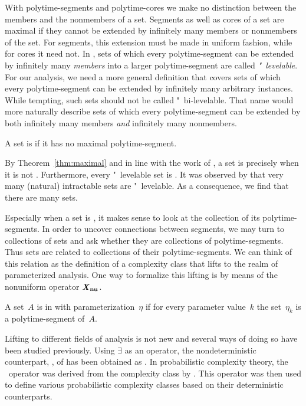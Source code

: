 With polytime-segments and polytime-cores we make no distinction between the members and the nonmembers of a set.
Segments as well as cores of a set are maximal if they cannot be extended by infinitely many members or nonmembers of the set.
For segments, this extension must be made in uniform fashion, while for cores it need not.
In \parencite{orponen1985polynomial,orponen1986optimal}, sets of which every polytime-segment can be extended by infinitely many \emph{members} into a larger polytime-segment are called \emph{"~levelable}.
For our analysis, we need a more general definition that covers sets of which every polytime-segment can be extended by infinitely many arbitrary instances.
While tempting, such sets should not be called "~bi-levelable.
That name would more naturally describe sets of which every polytime-segment can be extended by both infinitely many members \emph{and} infinitely many nonmembers.
\begin{definition}
  A set is  if it has no maximal polytime-segment.
\end{definition}
By Theorem~\ref{thm:maximal} and in line with the work of \textcite{orponen1985polynomial}, a set is  precisely when it is not .
Furthermore, every "~levelable set is .
It was observed by \textcite{orponen1986optimal} that very many (natural) intractable sets are "~levelable.
As a consequence, we find that there are many  sets.

Especially when a set is , it makes sense to look at the collection of its polytime-segments.
In order to uncover connections between segments, we may turn to collections of sets and ask whether they are collections of polytime-segments.
Thus sets are related to collections of their polytime-segments.
We can think of this relation as the definition of a complexity class that lifts  to the realm of parameterized analysis.
One way to formalize this lifting is by means of the nonuniform operator $\textnormal{\textbf{\textit{X}$_\textbf{nu}$}}$.
\begin{definition}
  A set~$A$ is in  with parameterization~$\eta$ if for every parameter value~$k$ the set~$\eta_k$ is a polytime-segment of~$A$.
\end{definition}

Lifting  to different fields of analysis is not new and several ways of doing so have been studied previously.
Using $\exists$ as an operator, the nondeterministic counterpart, , of  has been obtained as .
In probabilistic complexity theory, the ~operator was derived from the complexity class  by \textcite{schoning1989probabilistic}.
This operator was then used to define various probabilistic complexity classes based on their deterministic counterparts.

